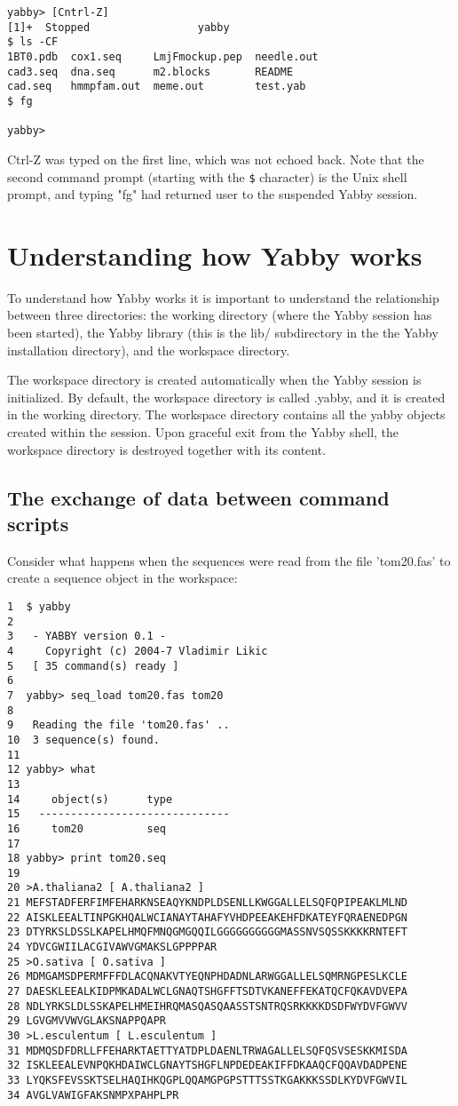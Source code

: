 \begin{verbatim}
yabby> [Cntrl-Z]
[1]+  Stopped                 yabby
$ ls -CF
1BT0.pdb  cox1.seq     LmjFmockup.pep  needle.out
cad3.seq  dna.seq      m2.blocks       README
cad.seq   hmmpfam.out  meme.out        test.yab
$ fg

yabby>
\end{verbatim}

Ctrl-Z was typed on the first line, which was not echoed back. Note
that the second command prompt (starting with the {\tt \$} character)
is the Unix shell prompt, and typing "fg" had returned user to
the suspended Yabby session.

\section{Understanding how Yabby works}

To understand how Yabby works it is important to understand the
relationship between three directories: the working directory
(where the Yabby session has been started), the Yabby library (this
is the lib/ subdirectory in the the Yabby installation directory),
and the workspace directory.

The workspace directory is created automatically when the Yabby
session is initialized. By default, the workspace directory is
called .yabby, and it is created in the working directory. The
workspace directory contains all the yabby objects created within
the session. Upon graceful exit from the Yabby shell, the workspace
directory is destroyed together with its content.

\subsection{The exchange of data between command scripts}

Consider what happens when the sequences were read from the file
'tom20.fas' to create a sequence object in the workspace:

\begin{verbatim}
1  $ yabby
2 
3   - YABBY version 0.1 -
4     Copyright (c) 2004-7 Vladimir Likic
5   [ 35 command(s) ready ]
6 
7  yabby> seq_load tom20.fas tom20
8  
9   Reading the file 'tom20.fas' ..
10  3 sequence(s) found.
11 
12 yabby> what
13 
14     object(s)      type
15   ------------------------------
16     tom20          seq   
17 
18 yabby> print tom20.seq
19
20 >A.thaliana2 [ A.thaliana2 ]
21 MEFSTADFERFIMFEHARKNSEAQYKNDPLDSENLLKWGGALLELSQFQPIPEAKLMLND
22 AISKLEEALTINPGKHQALWCIANAYTAHAFYVHDPEEAKEHFDKATEYFQRAENEDPGN
23 DTYRKSLDSSLKAPELHMQFMNQGMGQQILGGGGGGGGGGMASSNVSQSSKKKKRNTEFT
24 YDVCGWIILACGIVAWVGMAKSLGPPPPAR
25 >O.sativa [ O.sativa ]
26 MDMGAMSDPERMFFFDLACQNAKVTYEQNPHDADNLARWGGALLELSQMRNGPESLKCLE
27 DAESKLEEALKIDPMKADALWCLGNAQTSHGFFTSDTVKANEFFEKATQCFQKAVDVEPA
28 NDLYRKSLDLSSKAPELHMEIHRQMASQASQAASSTSNTRQSRKKKKDSDFWYDVFGWVV
29 LGVGMVVWVGLAKSNAPPQAPR
30 >L.esculentum [ L.esculentum ]
31 MDMQSDFDRLLFFEHARKTAETTYATDPLDAENLTRWAGALLELSQFQSVSESKKMISDA
32 ISKLEEALEVNPQKHDAIWCLGNAYTSHGFLNPDEDEAKIFFDKAAQCFQQAVDADPENE
33 LYQKSFEVSSKTSELHAQIHKQGPLQQAMGPGPSTTTSSTKGAKKKSSDLKYDVFGWVIL
34 AVGLVAWIGFAKSNMPXPAHPLPR
\end{verbatim}

